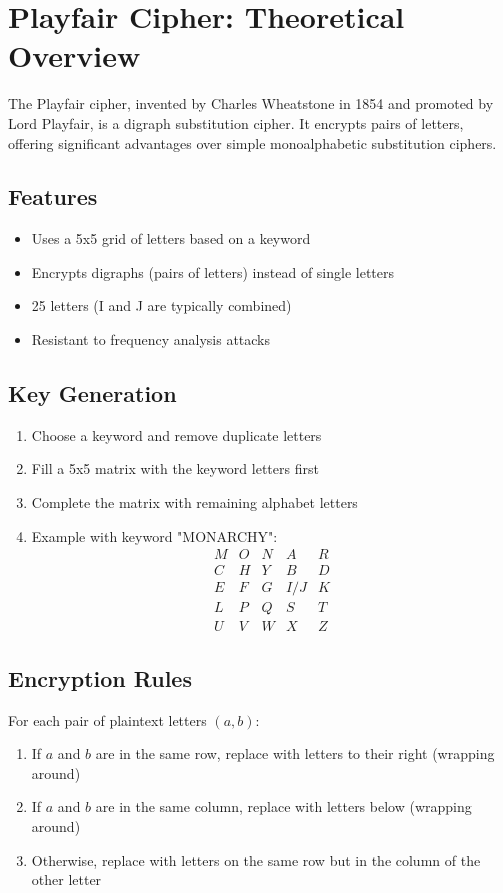 \documentclass[12pt,a4paper]{article}
\begin{document}

\section*{Playfair Cipher: Theoretical Overview}

The Playfair cipher, invented by Charles Wheatstone in 1854 and promoted by Lord Playfair, is a digraph substitution cipher. It encrypts pairs of letters, offering significant advantages over simple monoalphabetic substitution ciphers.

\subsection*{Features}
\begin{itemize}
    \item Uses a 5x5 grid of letters based on a keyword
    \item Encrypts digraphs (pairs of letters) instead of single letters
    \item 25 letters (I and J are typically combined)
    \item Resistant to frequency analysis attacks
\end{itemize}

\subsection*{Key Generation}
\begin{enumerate}
    \item Choose a keyword and remove duplicate letters
    \item Fill a 5x5 matrix with the keyword letters first
    \item Complete the matrix with remaining alphabet letters
    \item Example with keyword "MONARCHY":
    \[
    \begin{matrix}
    M & O & N & A & R \\
    C & H & Y & B & D \\
    E & F & G & I/J & K \\
    L & P & Q & S & T \\
    U & V & W & X & Z
    \end{matrix}
    \]
\end{enumerate}

\subsection*{Encryption Rules}
For each pair of plaintext letters $(a,b)$:
\begin{enumerate}
    \item If $a$ and $b$ are in the same row, replace with letters to their right (wrapping around)
    \item If $a$ and $b$ are in the same column, replace with letters below (wrapping around)
    \item Otherwise, replace with letters on the same row but in the column of the other letter
\end{enumerate}
\end{document}
